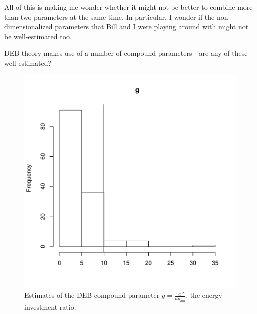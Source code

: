 \documentclass[12pt,reqno,final]{amsart}
\theoremstyle{plain}
\numberwithin{equation}{part}
\begin{document}
All of this is making me wonder whether it might not be better to
combine more than two parameters at the same time. In particular, I
wonder if the non-dimensionalized parameters that Bill and I were
playing around with might not be well-estimated too.

DEB theory makes use of a number of compound parameters - are any of
these well-estimated?

\begin{figure}
\includegraphics{Solving_the_problem_of_parameter_covariation_3-008}
\caption{Estimates of the DEB compound parameter $g =
  \frac{\epsilon_G \nu}{\kappa p_{am}}$, the energy investment
  ratio.}
\end{figure}
\end{document}
